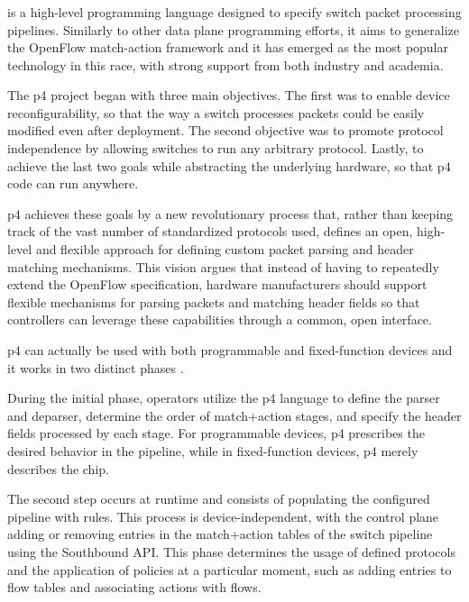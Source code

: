 \subsubsection[P4]{}
 is a high-level programming language designed to specify switch packet processing pipelines. Similarly to other data plane programming efforts, it aims to generalize the OpenFlow match-action framework and it has emerged as the most popular technology in this race, with strong support from both industry and academia\cite{hauser_survey_2021}.

The \gls{p4} project began with three main objectives\cite{bosshart_p4_2014}. The first was to enable device reconfigurability, so that the way a switch processes packets could be easily modified even after deployment. The second objective was to promote protocol independence by allowing switches to run any arbitrary protocol. Lastly, to achieve the last two goals while abstracting the underlying hardware, so that \gls{p4} code can run anywhere. 

\gls{p4} achieves these goals by a new revolutionary process that, rather than keeping track of the vast number of standardized protocols used, defines an open, high-level and flexible approach for defining custom packet parsing and header matching mechanisms. This vision argues that instead of having to repeatedly extend the OpenFlow specification, hardware manufacturers should support flexible mechanisms for parsing packets and matching header fields so that controllers can leverage these capabilities through a common, open interface. \cite{bosshart_p4_2014}

\gls{p4} can actually be used with both programmable and fixed-function devices\cite{peterson_software-defined_2021} and it works in two distinct phases \cite{bosshart_p4_2014}\cite{bifulco_survey_2018}. 

During the initial phase, operators utilize the \gls{p4} language to define the parser and deparser, determine the order of match+action stages, and specify the header fields processed by each stage. For programmable devices, \gls{p4} prescribes the desired behavior in the pipeline, while in fixed-function devices, \gls{p4} merely describes the chip. 

The second step occurs at runtime and consists of populating the configured pipeline with rules. This process is device-independent, with the control plane adding or removing entries in the match+action tables of the switch pipeline using the Southbound API. This phase determines the usage of defined protocols and the application of policies at a particular moment, such as adding entries to flow tables and associating actions with flows.

